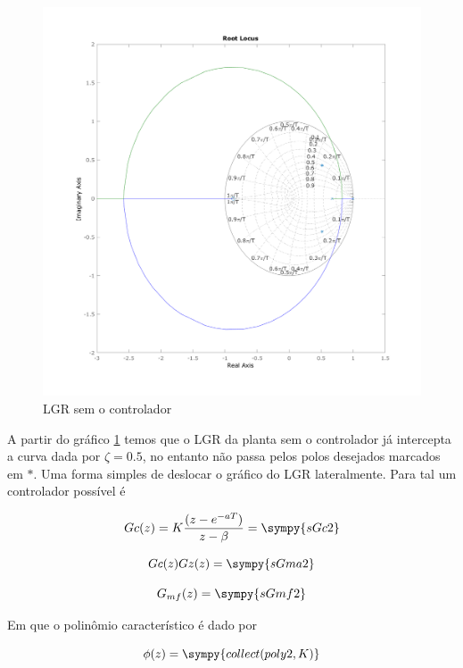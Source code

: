 \documentclass[a4paper,11pt]{article}
\begin{document}
\begin{figure}[H]
    \centering
    \includegraphics[width=0.9\linewidth]{img/exsim3-rlocus-g2.png}
    \caption{LGR sem o controlador}
    \label{fig:ex3-rlocus-g2}
\end{figure}

A partir do gráfico \ref{fig:ex3-rlocus-g2} temos que o LGR da planta sem o controlador já intercepta a curva dada por $\zeta = 0.5$, no entanto não passa pelos polos desejados marcados em $*$. Uma forma simples de deslocar o gráfico do LGR lateralmente. Para tal um controlador possível é

\begin{equation}
    Gc(z) = K\frac{(z-e^{-aT})}{z-\beta} = \sympy{sGc2}
\end{equation}

\begin{equation}
    Gc(z)Gz(z) = \sympy{sGma2}
\end{equation}

\begin{equation}
    G_{mf}(z) = \sympy{sGmf2}
\end{equation}

Em que o polinômio característico é dado por

\begin{equation}
    \phi(z) = \sympy{collect(poly2,K)}
\end{equation}
\end{document}
